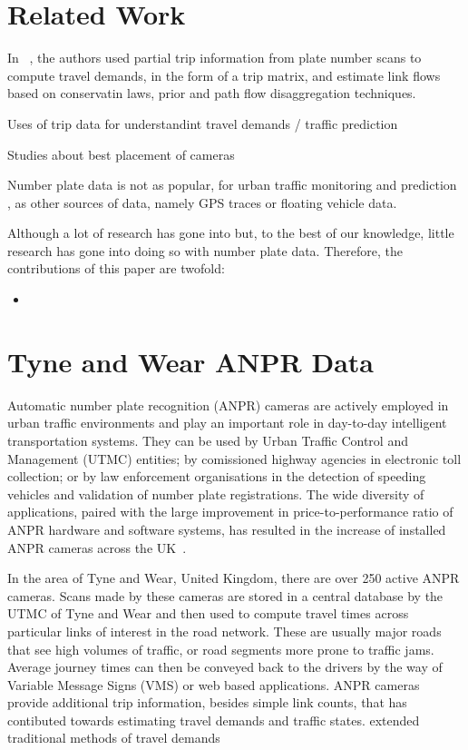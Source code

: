\section{Related Work}
\label{s.related}

In ~\cite{Castillo2008}, the authors used partial trip information from plate number scans to compute travel demands, in the form of a trip matrix, and estimate link flows based on conservatin laws, prior and path flow disaggregation techniques.


Uses of trip data for understandint travel demands / traffic prediction

Studies about best placement of cameras

Number plate data is not as popular, for urban traffic monitoring and prediction , as other sources of data, namely GPS traces or floating vehicle data.

Although a lot of research has gone into 
but, to the best of our knowledge, little research has gone into doing so with number plate data. Therefore, the contributions of this paper are twofold:

\begin{itemize}
  \item
\end{itemize}

\section{Tyne and Wear ANPR Data}
\label{s.ncl}
Automatic number plate recognition (ANPR) cameras are actively employed in urban traffic environments and play an important role in day-to-day intelligent transportation systems. They can be used by Urban Traffic Control and Management (UTMC) entities; by comissioned highway agencies in electronic toll collection; or by law enforcement organisations in the detection of speeding vehicles and validation of number plate registrations. The wide diversity of applications, paired with the large improvement in price-to-performance ratio of ANPR hardware and software systems, has resulted in the increase of installed ANPR cameras across the UK~\cite{SurveyITS2011, EvolutionUTMC2013}.

In the area of Tyne and Wear, United Kingdom, there are over 250 active ANPR cameras. Scans made by these cameras are stored in a central database by the UTMC of Tyne and Wear and then used to compute travel times across particular links of interest in the road network. These are usually major roads that see high volumes of traffic, or road segments more prone to traffic jams. Average journey times can then be conveyed back to the drivers by the way of Variable Message Signs (VMS) or web based applications. ANPR cameras provide additional trip information, besides simple link counts, that has contibuted towards  estimating travel demands and traffic states. extended traditional methods of  travel demands

